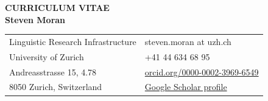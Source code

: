 \documentclass[11pt]{article}
\begin{document}


\begin{center}
{\bf CURRICULUM VITAE\\Steven Moran}\\

\vskip 12pt

\begin{tabular}{ll}
%



Linguistic Research Infrastructure & steven.moran at uzh.ch \\
University of Zurich & +41 44 634 68 95 \\ 
Andreasstrasse 15, 4.78 & \href{https://orcid.org/0000-0002-3969-6549}{orcid.org/0000-0002-3969-6549} \\
8050 Zurich, Switzerland & \href{https://scholar.google.com/citations?user=PpTOh08AAAAJ\&hl=en}{Google Scholar profile} \\


\end{tabular}
\end{center}
\end{document}
